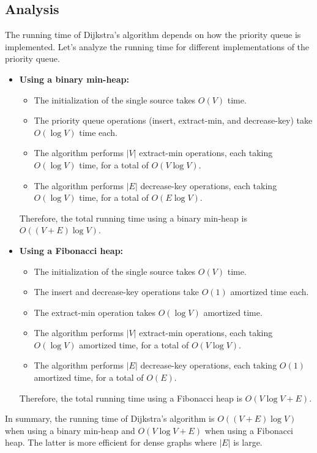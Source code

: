 \subsection*{Analysis}
The running time of Dijkstra's algorithm depends on how the priority queue is implemented. Let's analyze the running time for different implementations of the priority queue.

\begin{itemize}
    \item \textbf{Using a binary min-heap:} 
    \begin{itemize}
        \item The initialization of the single source takes $O(V)$ time.
        \item The priority queue operations (insert, extract-min, and decrease-key) take $O(\log V)$ time each.
        \item The algorithm performs $|V|$ extract-min operations, each taking $O(\log V)$ time, for a total of $O(V \log V)$.
        \item The algorithm performs $|E|$ decrease-key operations, each taking $O(\log V)$ time, for a total of $O(E \log V)$.
    \end{itemize}
    Therefore, the total running time using a binary min-heap is $O((V + E) \log V)$.

    \item \textbf{Using a Fibonacci heap:}
    \begin{itemize}
        \item The initialization of the single source takes $O(V)$ time.
        \item The insert and decrease-key operations take $O(1)$ amortized time each.
        \item The extract-min operation takes $O(\log V)$ amortized time.
        \item The algorithm performs $|V|$ extract-min operations, each taking $O(\log V)$ amortized time, for a total of $O(V \log V)$.
        \item The algorithm performs $|E|$ decrease-key operations, each taking $O(1)$ amortized time, for a total of $O(E)$.
    \end{itemize}
    Therefore, the total running time using a Fibonacci heap is $O(V \log V + E)$.
\end{itemize}

In summary, the running time of Dijkstra's algorithm is $O((V + E) \log V)$ when using a binary min-heap and $O(V \log V + E)$ when using a Fibonacci heap. The latter is more efficient for dense graphs where $|E|$ is large.